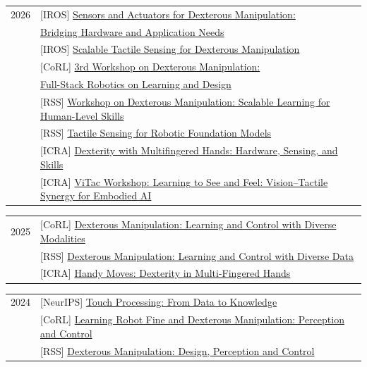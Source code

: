 \documentclass{resume}
\begin{document}
{\renewcommand{\arraystretch}{1.1}
\begin{tabular}{@{}L{2.1cm}l@{}}
{2026} & {[IROS] \href{https://sensact4dexman-workshop.github.io/}{Sensors and Actuators for Dexterous Manipulation:}} \\
       & {\href{https://sensact4dexman-workshop.github.io/}{Bridging Hardware and Application Needs}} \\
& {[IROS] \href{https://sites.google.com/view/iros26-tactile-dexterity/home}{Scalable Tactile Sensing for Dexterous Manipulation}} \\
& {[CoRL] \href{https://dex-manipulation.github.io/corl2026/}{3rd Workshop on Dexterous Manipulation:}} \\
& {\href{https://dex-manipulation.github.io/corl2026/}{Full-Stack Robotics on Learning and Design}} \\
& {[RSS] \href{https://dex-manipulation.github.io/rss2026/}{Workshop on Dexterous Manipulation:
Scalable Learning for Human-Level Skills}} \\
& {[RSS] \href{https://tac-for-fm.github.io/rss2026/}{Tactile Sensing for Robotic Foundation Models
}} \\
& {[ICRA] \href{https://dex-manipulation.github.io/icra2026/}{Dexterity with Multifingered Hands:
Hardware, Sensing, and Skills}} \\
& {[ICRA]} \href{https://shanluo.github.io/ViTacWorkshops/vitac2026}{ViTac Workshop: Learning to See and Feel: Vision–Tactile Synergy for Embodied AI}
\end{tabular}}

{\renewcommand{\arraystretch}{1.1}
\begin{tabular}{@{}L{2.1cm}l@{}}
{2025} & {[CoRL]} \href{https://dex-manipulation.github.io/corl2025/}{Dexterous Manipulation: Learning and Control with Diverse Modalities} \\
& {[RSS]} \href{https://dex-manipulation.github.io/rss2025/}{Dexterous Manipulation: Learning and Control with Diverse Data} \\
& {[ICRA] \href{https://sites.google.com/view/dexterity-workshop-icra2025/home}{Handy Moves: Dexterity in Multi-Fingered Hands}}
\end{tabular}}


{\renewcommand{\arraystretch}{1.1}
\begin{tabular}{@{}L{2.1cm}l@{}}
{2024} & {[NeurIPS] \href{https://www.touchprocessing.org/2024/}{Touch Processing: From Data to Knowledge}}\\
& {[CoRL]} \href{https://dex-manipulation.github.io/corl2024/}{Learning Robot Fine and Dexterous Manipulation: Perception and Control} \\
& {[RSS]} \href{https://dex-manipulation.github.io/rss2024/}{Dexterous Manipulation: Design, Perception and Control}
\end{tabular}}
\end{document}

